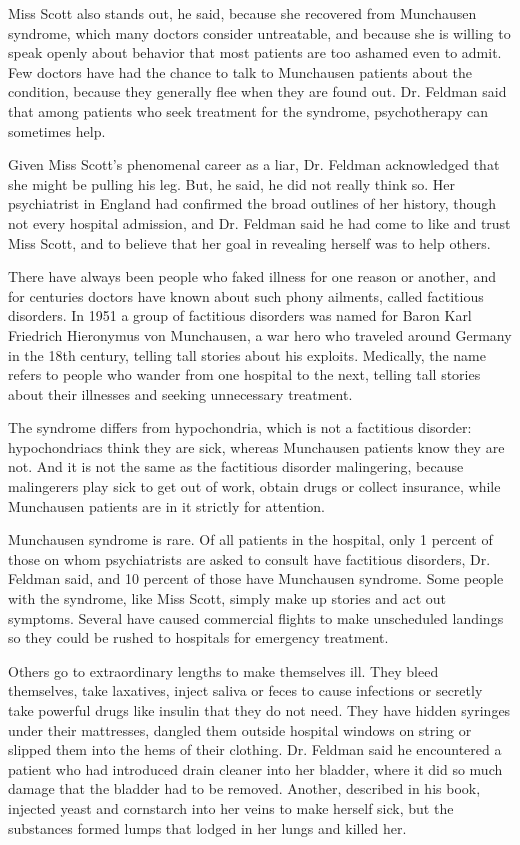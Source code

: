 Miss Scott also stands out, he said, because she recovered from
Munchausen syndrome, which many doctors consider untreatable, and
because she is willing to speak openly about behavior that most patients
are too ashamed even to admit. Few doctors have had the chance to talk
to Munchausen patients about the condition, because they generally flee
when they are found out. Dr. Feldman said that among patients who seek
treatment for the syndrome, psychotherapy can sometimes help.

Given Miss Scott's phenomenal career as a liar, Dr. Feldman acknowledged
that she might be pulling his leg. But, he said, he did not really think
so. Her psychiatrist in England had confirmed the broad outlines of her
history, though not every hospital admission, and Dr. Feldman said he
had come to like and trust Miss Scott, and to believe that her goal in
revealing herself was to help others.

There have always been people who faked illness for one reason or
another, and for centuries doctors have known about such phony ailments,
called factitious disorders. In 1951 a group of factitious disorders was
named for Baron Karl Friedrich Hieronymus von Munchausen, a war hero who
traveled around Germany in the 18th century, telling tall stories about
his exploits. Medically, the name refers to people who wander from one
hospital to the next, telling tall stories about their illnesses and
seeking unnecessary treatment.

The syndrome differs from hypochondria, which is not a factitious
disorder: hypochondriacs think they are sick, whereas Munchausen
patients know they are not. And it is not the same as the factitious
disorder malingering, because malingerers play sick to get out of work,
obtain drugs or collect insurance, while Munchausen patients are in it
strictly for attention.

Munchausen syndrome is rare. Of all patients in the hospital, only 1
percent of those on whom psychiatrists are asked to consult have
factitious disorders, Dr. Feldman said, and 10 percent of those have
Munchausen syndrome. Some people with the syndrome, like Miss Scott,
simply make up stories and act out symptoms. Several have caused
commercial flights to make unscheduled landings so they could be rushed
to hospitals for emergency treatment.

Others go to extraordinary lengths to make themselves ill. They bleed
themselves, take laxatives, inject saliva or feces to cause infections
or secretly take powerful drugs like insulin that they do not need. They
have hidden syringes under their mattresses, dangled them outside
hospital windows on string or slipped them into the hems of their
clothing. Dr. Feldman said he encountered a patient who had introduced
drain cleaner into her bladder, where it did so much damage that the
bladder had to be removed. Another, described in his book, injected
yeast and cornstarch into her veins to make herself sick, but the
substances formed lumps that lodged in her lungs and killed her.


